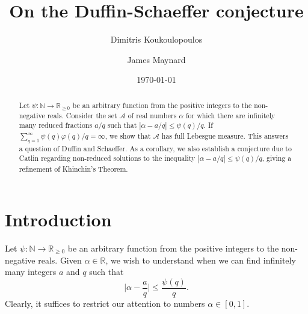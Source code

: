 \documentclass[12pt]{amsart}
\numberwithin{equation}{section}
\theoremstyle{definition}
\theoremstyle{remark}
\newcommand{\N}{\mathbb{N}}
\newcommand{\R}{\mathbb{R}}
\renewcommand{\phi}{\varphi}
\renewcommand{\le}{\leqslant}
\renewcommand{\ge}{\geqslant}
\begin{document}
\title{On the Duffin-Schaeffer conjecture}
\author{Dimitris Koukoulopoulos}
\address{D\'epartement de math\'ematiques et de statistique\\
Universit\'e de Montr\'eal\\
CP 6128 succ. Centre-Ville\\
Montr\'eal, QC H3C 3J7\\
Canada}


\author{James Maynard}
\address{Mathematical Institute, Radcliffe Observatory quarter, Woodstock Road, Oxford OX2 6GG, England}











\date{\today}



\begin{abstract}
Let $\psi:\mathbb{N}\to\mathbb{R}_{\ge0}$ be an arbitrary function from the positive integers to the non-negative reals. Consider the set $\mathcal{A}$ of real numbers $\alpha$ for which there are infinitely many reduced fractions $a/q$ such that $|\alpha-a/q|\le \psi(q)/q$. If $\sum_{q=1}^\infty \psi(q)\phi(q)/q=\infty$, we show that $\mathcal{A}$ has full Lebesgue measure. This answers a question of Duffin and Schaeffer. As a corollary, we also establish a conjecture due to Catlin regarding non-reduced solutions to the inequality $|\alpha- a/q|\le \psi(q)/q$, giving a refinement of Khinchin's Theorem.
\end{abstract}



\maketitle


\section{Introduction}
Let $\psi:\N\to\R_{\ge0}$ be an arbitrary function from the positive integers to the non-negative reals. Given $\alpha\in\R$, we wish to understand when we can find infinitely many integers $a$ and $q$ such that
\begin{equation}\label{eq:rational approximations}
\bigg|\alpha-\frac{a}{q}\bigg| \le \frac{\psi(q)}{q}.
\end{equation}
Clearly, it suffices to restrict our attention to numbers $\alpha\in[0,1]$. 
\end{document}

